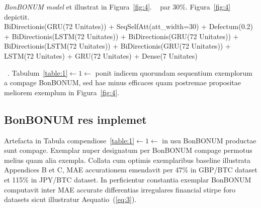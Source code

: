 \documentclass[preprint,3p,times,twocolumn]{elsarticle}  %
\begin{document}
\textit{BonBONUM model} et illustrat in Figura~\ref{fig:4}. 
~\citep{cho14} par 30\%. Figura~\ref{fig:4} depictit. \\
{%
\scriptsize  %
BiDirectionis(GRU(72 Unitates)) + SeqSelfAtt(att\_width=30) +
Defectum(0.2) + BiDirectionis(LSTM(72 Unitates)) +
BiDirectionis(GRU(72 Unitates)) + BiDirectionis(LSTM(72 Unitates)) +
BiDirectionis(GRU(72 Unitates)) + LSTM(72 Unitates) + GRU(72 Unitates) +
Dense(7 Unitates)}
\setlength{\leftskip}{10pt}\rightskip=10pt\\  %
\renewcommand\baselinestretch{0.3}\selectfont %

\setlength{\leftskip}{0pt} \rightskip=0pt     %
\renewcommand\baselinestretch{1}\selectfont   %
\lipsum[27-29]
~\citep{probst19}. 
Tabulum~\ref{table:1}$\leftarrow1\leftarrow$  
ponit indicem quorundam sequentium exemplorum a
compage BonBONUM, sed hae minus efficaces quam postremae propositae
meliorem exemplum in Figura~\ref{fig:4}.

\subsection{BonBONUM res implemet}

Artefacta in Tabula compendiose~\ref{table:1}$\leftarrow1\leftarrow$ in 
usu BonBONUM productae sunt compage. Exemplar nuper designatum per BonBONUM 
compage permotus melius quam alia exempla. Collata cum optimis exemplaribus 
baseline illustrata Appendices B et C, MAE accurationem emendavit per 47\%
in GBP/BTC dataset et 115\% in JPY/BTC dataset. In perficientur constantia 
exemplar BonBONUM computavit inter MAE accurate differentias irregulares 
financial stirpe foro datasets sicut illustratur Aequatio~(\ref{eq:3}). 
\end{document}

